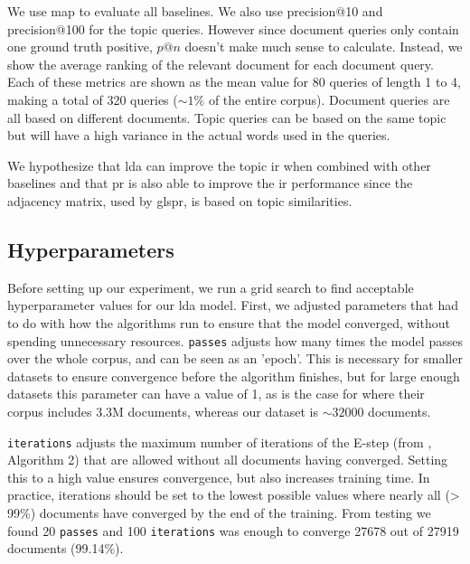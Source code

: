 We use \gls{map} to evaluate all baselines. 
We also use precision@10 and precision@100 for the topic queries. 
However since document queries only contain one ground truth positive, $p @ n$ doesn't make much sense to calculate. 
Instead, we show the average ranking of the relevant document for each document query.
Each of these metrics are shown as the mean value for 80 queries of length 1 to 4, making a total of 320 queries ($\sim 1\%$ of the entire corpus).
Document queries are all based on different documents. 
Topic queries can be based on the same topic but will have a high variance in the actual words used in the queries.

We hypothesize that \gls{lda} can improve the topic \gls{ir} when combined with other baselines and that \gls{pr} is also able to improve the \gls{ir} performance since the adjacency matrix, used by gls{pr}, is based on topic similarities.


\subsection{Hyperparameters}\label{subsec:hyperparameters}
Before setting up our experiment, we run a grid search to find acceptable hyperparameter values for our \gls{lda} model.
First, we adjusted parameters that had to do with how the algorithms run to ensure that the model converged, without spending unnecessary resources.
\texttt{passes} adjusts how many times the model passes over the whole corpus, and can be seen as an 'epoch'. 
This is necessary for smaller datasets to ensure convergence before the algorithm finishes, but for large enough datasets this parameter can have a value of 1, as is the case for \citeauthor{blei2010online}\cite{blei2010online} where their corpus includes 3.3M documents, whereas our dataset is $\sim32000$ documents.

\texttt{iterations} adjusts the maximum number of iterations of the E-step (from \citeauthor{blei2010online}\cite{blei2010online}, Algorithm 2) that are allowed without all documents having converged. 
Setting this to a high value ensures convergence, but also increases training time. 
In practice, iterations should be set to the lowest possible values where nearly all (> 99\%) documents have converged by the end of the training.
From testing we found 20 \texttt{passes} and 100 \texttt{iterations} was enough to converge 27678 out of 27919 documents (99.14\%).

